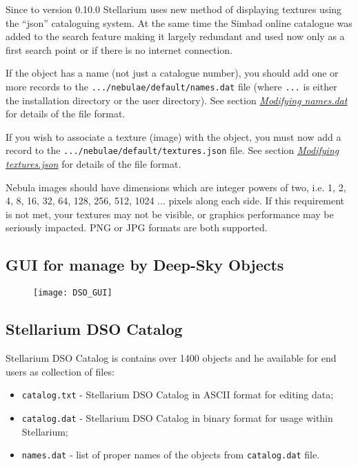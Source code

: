 Since to version 0.10.0 Stellarium uses new method of displaying
textures using the ``json'' cataloguing system. At the same time the
Simbad online catalogue was added to the search feature making it
largely redundant and used now only as a first search point or if there
is no internet connection.

If the object has a name (not just a catalogue number), you should add
one or more records to the \texttt{.../nebulae/default/names.dat} file
(where \texttt{...} is either the installation directory or the user
directory). See section
\emph{\protect\hyperlink{Modifyingux5fnames.dat}{Modifying names.dat}}
for details of the file format.

If you wish to associate a texture (image) with the object, you must now
add a record to the \texttt{.../nebulae/default/textures.json} file. See
section \emph{\protect\hyperlink{Modifyingux5ftextures.json}{Modifying
textures.json}} for details of the file format.

Nebula images should have dimensions which are integer powers of two,
i.e. 1, 2, 4, 8, 16, 32, 64, 128, 256, 512, 1024 ... pixels along each
side. If this requirement is not met, your textures may not be visible,
or graphics performance may be seriously impacted. PNG or JPG formats
are both supported.

\subsection{GUI for manage by Deep-Sky
Objects}\label{gui-for-manage-by-deep-sky-objects}

\begin{figure}[h]
\centering\texttt{[image: DSO\_GUI]}
\end{figure}

\subsection{Stellarium DSO Catalog}\label{stellarium-dso-catalog}

Stellarium DSO Catalog is contains over 1400 objects and he available
for end users as collection of files:

\begin{itemize}
\item
  \texttt{catalog.txt} - Stellarium DSO Catalog in ASCII format for
  editing data;
\item
  \texttt{catalog.dat} - Stellarium DSO Catalog in binary format for
  usage within Stellarium;
\item
  \texttt{names.dat} - list of proper names of the objects from
  \texttt{catalog.dat} file.
\end{itemize}

